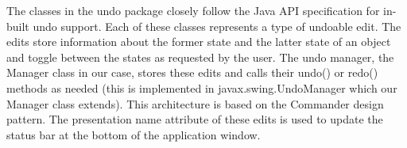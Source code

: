\tab The classes in the undo package closely follow the Java API specification for in-built undo support. Each of these classes represents a type of undoable edit. The edits store information about the former state and the latter state of an object and toggle between the states as requested by the user. The undo manager, the Manager class in our case, stores these edits and calls their undo() or redo() methods as needed (this is implemented in javax.swing.UndoManager which our Manager class extends). This architecture is based on the Commander design pattern. The presentation name attribute of these edits is used to update the status bar at the bottom of the application window.


